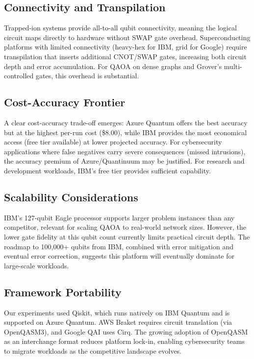 \documentclass[conference]{IEEEtran}
\begin{document}
\subsection{Connectivity and Transpilation}

Trapped-ion systems provide all-to-all qubit connectivity, meaning the logical circuit maps directly to hardware without SWAP gate overhead. Superconducting platforms with limited connectivity (heavy-hex for IBM, grid for Google) require transpilation that inserts additional CNOT/SWAP gates, increasing both circuit depth and error accumulation. For QAOA on dense graphs and Grover's multi-controlled gates, this overhead is substantial.

\subsection{Cost-Accuracy Frontier}

A clear cost-accuracy trade-off emerges: Azure Quantum offers the best accuracy but at the highest per-run cost (\$8.00), while IBM provides the most economical access (free tier available) at lower projected accuracy. For cybersecurity applications where false negatives carry severe consequences (missed intrusions), the accuracy premium of Azure/Quantinuum may be justified. For research and development workloads, IBM's free tier provides sufficient capability.

\subsection{Scalability Considerations}

IBM's 127-qubit Eagle processor supports larger problem instances than any competitor, relevant for scaling QAOA to real-world network sizes. However, the lower gate fidelity at this qubit count currently limits practical circuit depth. The roadmap to 100,000+ qubits from IBM, combined with error mitigation and eventual error correction, suggests this platform will eventually dominate for large-scale workloads.

\subsection{Framework Portability}

Our experiments used Qiskit, which runs natively on IBM Quantum and is supported on Azure Quantum. AWS Braket requires circuit translation (via OpenQASM3), and Google QAI uses Cirq. The growing adoption of OpenQASM as an interchange format reduces platform lock-in, enabling cybersecurity teams to migrate workloads as the competitive landscape evolves.
\end{document}
